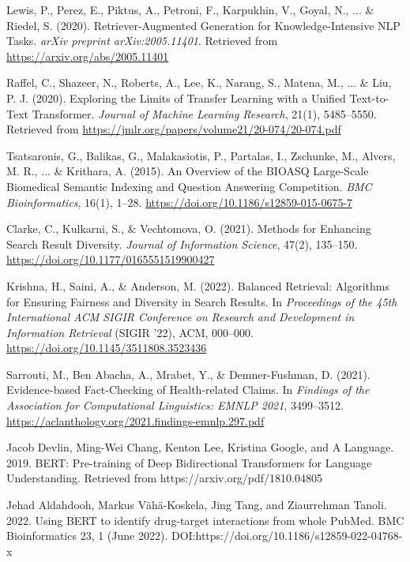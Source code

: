 \documentclass[sigconf]{acmart}
\begin{document}
\begin{thebibliography}{}

Lewis, P., Perez, E., Piktus, A., Petroni, F., Karpukhin, V., Goyal, N., ... \& Riedel, S. (2020).
Retriever-Augmented Generation for Knowledge-Intensive NLP Tasks.
\textit{arXiv preprint arXiv:2005.11401}. Retrieved from \url{https://arxiv.org/abs/2005.11401}

Raffel, C., Shazeer, N., Roberts, A., Lee, K., Narang, S., Matena, M., ... \& Liu, P. J. (2020).
Exploring the Limits of Transfer Learning with a Unified Text-to-Text Transformer.
\textit{Journal of Machine Learning Research}, 21(1), 5485–5550. Retrieved from \url{https://jmlr.org/papers/volume21/20-074/20-074.pdf}

Tsatsaronis, G., Balikas, G., Malakasiotis, P., Partalas, I., Zschunke, M., Alvers, M. R., ... \& Krithara, A. (2015).
An Overview of the BIOASQ Large-Scale Biomedical Semantic Indexing and Question Answering Competition.
\textit{BMC Bioinformatics}, 16(1), 1–28. \url{https://doi.org/10.1186/s12859-015-0675-7}

Clarke, C., Kulkarni, S., \& Vechtomova, O. (2021).
Methods for Enhancing Search Result Diversity.
\textit{Journal of Information Science}, 47(2), 135–150. \url{https://doi.org/10.1177/0165551519900427}

Krishna, H., Saini, A., \& Anderson, M. (2022).
Balanced Retrieval: Algorithms for Ensuring Fairness and Diversity in Search Results.
In \textit{Proceedings of the 45th International ACM SIGIR Conference on Research and Development in Information Retrieval} (SIGIR '22), ACM, 000–000. \url{https://doi.org/10.1145/3511808.3523436}

Sarrouti, M., Ben Abacha, A., Mrabet, Y., \& Demner-Fushman, D. (2021).
Evidence-based Fact-Checking of Health-related Claims.
In \textit{Findings of the Association for Computational Linguistics: EMNLP 2021}, 3499–3512. \url{https://aclanthology.org/2021.findings-emnlp.297.pdf}

Jacob Devlin, Ming-Wei Chang, Kenton Lee, Kristina Google, and A Language. 2019. BERT: Pre-training of Deep Bidirectional Transformers for Language Understanding. Retrieved from https://arxiv.org/pdf/1810.04805

Jehad Aldahdooh, Markus Vähä-Koskela, Jing Tang, and Ziaurrehman Tanoli. 2022. Using BERT to identify drug-target interactions from whole PubMed. BMC Bioinformatics 23, 1 (June 2022). DOI:https://doi.org/10.1186/s12859-022-04768-x

\end{thebibliography}
\end{document}
